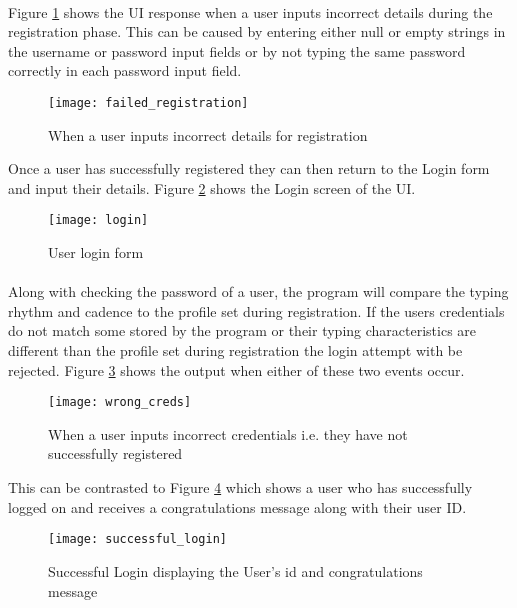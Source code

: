 \documentclass{article}
\begin{document}
\paragraph{}
Figure \ref{fig:failed_registration} shows the UI response when a user inputs incorrect details during the registration phase. This can be caused by entering either null or empty strings in the username or password input fields or by not typing the same password correctly in each password input field. 

\begin{figure}[H]
    \centering
    \texttt{[image: failed\_registration]}
    \caption{When a user inputs incorrect details for registration}
    \label{fig:failed_registration}
\end{figure}

Once a user has successfully registered they can then return to the Login form and input their details. Figure \ref{fig:login} shows the Login screen of the UI. 

\begin{figure}[H]
    \centering
    \texttt{[image: login]}
    \caption{User login form}
    \label{fig:login}
\end{figure}

\paragraph{}
Along with checking the password of a user, the program will compare the typing rhythm and cadence to the profile set during registration. If the users credentials do not match some stored by the program or their typing characteristics are different than the profile set during registration the login attempt with be rejected. Figure \ref{fig:wrong_creds} shows the output when either of these two events occur.  


\begin{figure}[H]
    \centering
    \texttt{[image: wrong\_creds]}
    \caption{When a user inputs incorrect credentials i.e. they have not successfully registered}
    \label{fig:wrong_creds}
\end{figure}

This can be contrasted to Figure \ref{fig:successful_login} which shows a user who has successfully logged on and receives a congratulations message along with their user ID.

\begin{figure}[H]
    \centering
    \texttt{[image: successful\_login]}
    \caption{Successful Login displaying the User's id and congratulations message}
    \label{fig:successful_login}
\end{figure}
\end{document}
